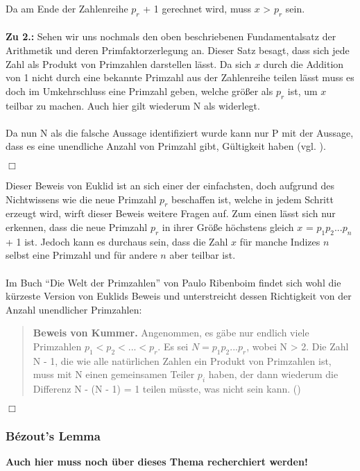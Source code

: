 \documentclass[german,12pt,a4paper]{article}
\begin{document}
Da am Ende der Zahlenreihe $p_r$ + 1 gerechnet wird, muss $x$ > $p_r$ sein.\\\\
\textbf{Zu 2.:} Sehen wir uns nochmals den oben beschriebenen Fundamentalsatz der Arithmetik und deren Primfaktorzerlegung an.
Dieser Satz besagt, dass sich jede Zahl als Produkt von Primzahlen darstellen lässt.
Da sich $x$ durch die Addition von 1 nicht durch eine bekannte Primzahl aus der Zahlenreihe teilen lässt muss es doch im Umkehrschluss eine Primzahl geben, welche größer als $p_r$ ist, um $x$ teilbar zu machen.
Auch hier gilt wiederum N als widerlegt.\\
\\Da nun N als die falsche Aussage identifiziert wurde kann nur P mit der Aussage, dass es eine unendliche Anzahl von Primzahl gibt, Gültigkeit haben (vgl. \cite[3]{Ribenboim2006}).
\begin{flushright}
$\Box$
\end{flushright}
Dieser Beweis von Euklid ist an sich einer der einfachsten, doch aufgrund des Nichtwissens wie die neue Primzahl $p_r$ beschaffen ist, welche in jedem Schritt erzeugt wird, wirft dieser Beweis weitere Fragen auf.
Zum einen lässt sich nur erkennen, dass die neue Primzahl $p_r$ in ihrer Größe höchstens gleich\newline
$x$ = $p_1p_2...p_n$ + 1 ist. Jedoch kann es durchaus sein, dass die Zahl $x$ für manche Indizes $n$ selbst eine Primzahl und für andere $n$ aber teilbar ist.\\
\\Im Buch “Die Welt der Primzahlen” von Paulo Ribenboim findet sich wohl die kürzeste Version von Euklids Beweis und unterstreicht dessen Richtigkeit von der Anzahl unendlicher Primzahlen:\\
\begin{quote}
\small
\textbf{Beweis von Kummer.} Angenommen, es gäbe nur endlich viele Primzahlen $p_1 < p_2 <...< p_r$. Es sei $N = p_1p_2...p_r$, wobei N > 2.
Die Zahl N - 1, die wie alle natürlichen Zahlen ein Produkt von Primzahlen ist, muss mit N einen gemeinsamen Teiler $p_i$ haben, der dann wiederum die Differenz N - (N - 1) = 1 teilen müsste, was nicht sein kann. (\cite[4]{Ribenboim2006})
\end{quote}
\begin{flushright}
$\Box$
\end{flushright}

\subsubsection{Bézout's Lemma}
\textbf{Auch hier muss noch über dieses Thema recherchiert werden!}\\
\end{document}
